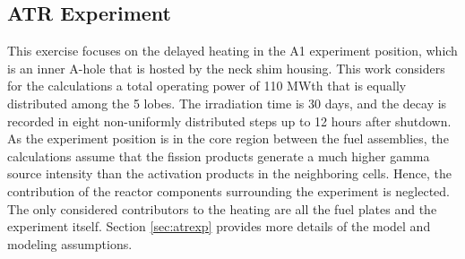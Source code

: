 
\subsection{ATR Experiment}


This exercise focuses on the delayed heating in the A1 experiment position, which is an inner A-hole that is hosted by the neck shim housing.
This work considers for the calculations a total operating power of 110 MWth that is equally distributed among the 5 lobes.
The irradiation time is 30 days, and the decay is recorded in eight non-uniformly distributed steps up to 12 hours after shutdown.
As the experiment position is in the core region between the fuel assemblies, the calculations assume that the fission products generate a much higher gamma source intensity than the activation products in the neighboring cells.
Hence, the contribution of the reactor components surrounding the experiment is neglected.
The only considered contributors to the heating are all the fuel plates and the experiment itself.
Section \ref{sec:atrexp} provides more details of the model and modeling assumptions.

